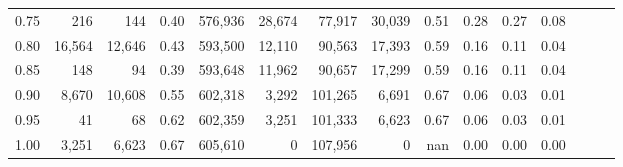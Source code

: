 \begin{tabular}{rrrrrrrrrrrrrrr}
0.75 &     216 &     144 &  0.40 &  576,936 &   28,674 &   77,917 &   30,039 &  0.51 &  0.28 &  0.27 &      0.08 \\
0.80 &  16,564 &  12,646 &  0.43 &  593,500 &   12,110 &   90,563 &   17,393 &  0.59 &  0.16 &  0.11 &      0.04 \\
0.85 &     148 &      94 &  0.39 &  593,648 &   11,962 &   90,657 &   17,299 &  0.59 &  0.16 &  0.11 &      0.04 \\
0.90 &   8,670 &  10,608 &  0.55 &  602,318 &    3,292 &  101,265 &    6,691 &  0.67 &  0.06 &  0.03 &      0.01 \\
0.95 &      41 &      68 &  0.62 &  602,359 &    3,251 &  101,333 &    6,623 &  0.67 &  0.06 &  0.03 &      0.01 \\
1.00 &   3,251 &   6,623 &  0.67 &  605,610 &        0 &  107,956 &        0 &   nan &  0.00 &  0.00 &      0.00 \\
\bottomrule
\end{tabular}
